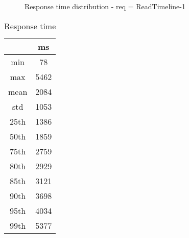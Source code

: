 \begin{minipage}{0.75\linewidth}
\begin{figure}[h]
\begin{adjustbox}{max width=1.0\linewidth, keepaspectratio}
  \end{adjustbox}
  \caption{Response time distribution - req = ReadTimeline-1}
\end{figure}
\end{minipage}\hfill\begin{minipage}{0.18\linewidth}
\begin{table}[h]
\begin{tabular}{|cc|}
\hline
\textbf{} & \textbf{ms}\\ \hline
 \Xhline{0.005\arrayrulewidth}
min & 78\\
 \Xhline{0.005\arrayrulewidth}
max & 5462\\
 \Xhline{0.005\arrayrulewidth}
mean & 2084\\
 \Xhline{0.005\arrayrulewidth}
std & 1053\\
\hline
\hline
 \Xhline{0.005\arrayrulewidth}
25th & 1386\\
 \Xhline{0.005\arrayrulewidth}
50th & 1859\\
 \Xhline{0.005\arrayrulewidth}
75th & 2759\\
 \Xhline{0.005\arrayrulewidth}
80th & 2929\\
 \Xhline{0.005\arrayrulewidth}
85th & 3121\\
 \Xhline{0.005\arrayrulewidth}
90th & 3698\\
 \Xhline{0.005\arrayrulewidth}
95th & 4034\\
 \Xhline{0.005\arrayrulewidth}
99th & 5377\\
\hline
\end{tabular}
\caption{Response time}
\end{table}
\end{minipage}\hfill